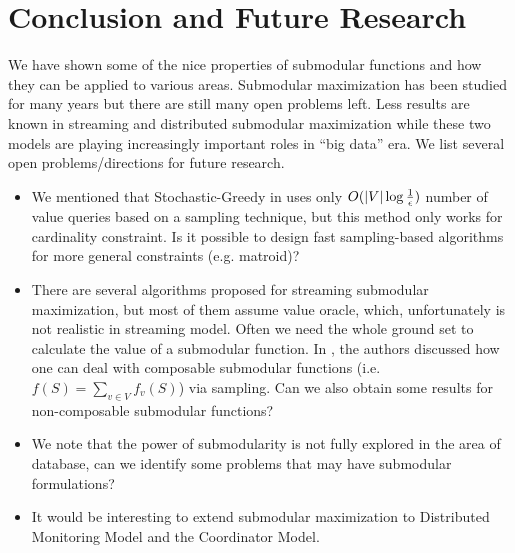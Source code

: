 \section{Conclusion and Future Research}
\label{sec:conclusion}
We have shown some of the nice properties of submodular functions and how they can be applied to various areas. Submodular maximization has been studied for many years but there are still many open problems left. Less results are known in streaming and distributed submodular maximization while these two models are playing increasingly important roles in ``big data'' era. We list several open problems/directions for future research.

\begin{itemize}
\item We mentioned that {\sc Stochastic-Greedy} in \cite{MBK+15} uses only $O(|V|\log\frac{1}{\epsilon})$ number of value queries based on a sampling technique, but this method only works for cardinality constraint. Is it possible to design fast sampling-based algorithms for more general constraints (e.g. matroid)?
\item There are several algorithms proposed for streaming submodular maximization, but most of them assume value oracle, which, unfortunately is not realistic in streaming model. Often we need the whole ground set to calculate the value of a submodular function. In \cite{BMK+14}, the authors discussed how one can deal with composable submodular functions (i.e. $f(S) = \sum_{v\in V}f_v(S)$) via sampling. Can we also obtain some results for non-composable submodular functions?
\item We note that the power of submodularity is not fully explored in the area of database, can we identify some problems that may have submodular formulations? 
\item It would be interesting to extend submodular maximization to Distributed Monitoring Model \cite{CMY11} and the Coordinator Model.
\end{itemize}
